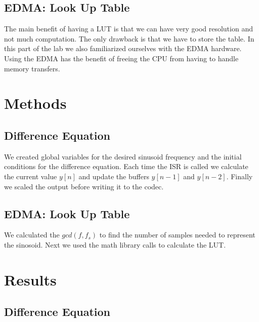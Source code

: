 \documentclass{article}
\begin{document}
\subsection{EDMA: Look Up Table}

The main benefit of having a LUT is that we can have very good resolution and not much computation.
The only drawback is that we have to store the table.
In this part of the lab we also familiarized ourselves with the EDMA hardware.
Using the EDMA has the benefit of freeing the CPU from having to handle memory transfers.


\section{Methods}

\subsection{Difference Equation}

We created global variables for the desired sinusoid frequency and the initial conditions for the difference equation.
Each time the ISR is called we calculate the current value $y[n]$ and update the buffers $y[n-1]$ and $y[n-2]$.
Finally we scaled the output before writing it to the codec.

\subsection{EDMA: Look Up Table}

We calculated the $gcd(f, f_s)$ to find the number of samples needed to represent the sinosoid.
Next we used the math library calls to calculate the LUT.
 

\section{Results}

\subsection{Difference Equation}
\end{document}
